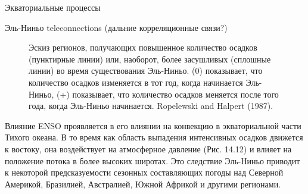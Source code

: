 \begin{chapter}{Экваториальные процессы}
\begin{section}{Эль-Ниньо teleconnections (дальние корреляционные связи?)}
\begin{figure}[t!]
\caption{Эскиз регионов, получающих повышенное количество осадков
(пунктирные линии) или, наоборот, более засушливых (сплошные линии) во
время существования Эль-Ниньо. (0) показывает, что количество осадков
изменяется в тот год, когда начинается Эль-Ниньо, (+) показывает, что
количество осадков меняется после того года, когда Эль-Ниньо
начинается. Ropelewski and Halpert (1987).}
\label{fig:teleconnections}
\end{figure}
%

Влияние ENSO проявляется в его влиянии на конвекцию в экваториальной
части Тихого океана. В то время как область выпадения интенсивных
осадков движется к востоку, она воздействует на атмосферное давление
(Рис. 14.12) и влияет на положение потока в более высоких широтах. Это
следствие Эль-Ниньо приводит к некоторой предсказуемости сезонных
составляющих погоды над Северной Америкой, Бразилией, Австралией,
Южной Африкой и другими регионами.
%


\end{section}
\end{chapter}
